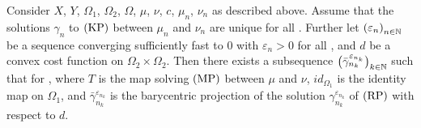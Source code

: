 \begin{theorem}\label{RelatRegSolOrigSolMap}
	Consider $X$, $Y$, $\Omega_1$, $\Omega_2$, $\Omega$, $\mu$, $\nu$, $c$, $\mu_n$, $\nu_n$ as described above. Assume that the solutions $\gamma_n$ to$\text{\normalfont\ (KP)}$ between $\mu_n$ and $\nu_n$ are unique for all \NinN. Further let ${(\varepsilon_n)}_{\NinN}$ be a sequence converging sufficiently fast to $0$ with $\varepsilon_n > 0$ for all \NinN, and $d$ be a convex cost function on $\Omega_2 \times \Omega_2$. Then there exists a subsequence ${\big(\bar{\gamma}^{\varepsilon_{n_k}}_{n_k}\big)}_{\NinN[k]}$ such that  for \Ninf, where $T$ is the map solving$\text{\normalfont\ (MP)}$ between $\mu$ and $\nu$, $id_{\Omega_1}$ is the identity map on $\Omega_1$, and $\bar{\gamma}^{\varepsilon_{n_k}}_{n_k}$ is the barycentric projection of the solution $\gamma^{\varepsilon_{n_k}}_{n_k}$ of$\text{\normalfont\ (RP)}$ with respect to $d$.
\end{theorem}

